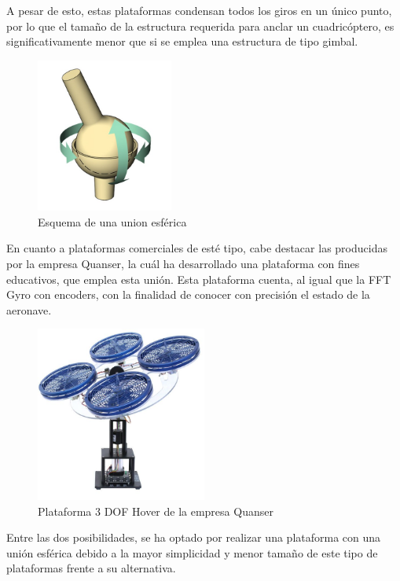 A pesar de esto, estas plataformas condensan todos los giros en un único punto, por lo que el tamaño de la estructura requerida para anclar un cuadricóptero, es significativamente menor  que si se emplea una estructura de tipo gimbal.

\begin{figure}[htb!]
	\centering
	\includegraphics[width=0.4\textwidth]{estadodelarte/union_esferica}
	\caption{Esquema de una union esférica}
	\label{union esferica}
\end{figure}
\newpage
En cuanto a plataformas comerciales de esté tipo, cabe destacar las producidas por la empresa Quanser, la cuál ha desarrollado una plataforma con fines educativos, que emplea esta unión. Esta plataforma cuenta, al igual que la FFT Gyro con encoders, con la finalidad de conocer con precisión el estado de la aeronave.
   
\begin{figure}[htb!]
	\centering
	\includegraphics[width=0.5\textwidth]{estadodelarte/quanser}
	\caption{Plataforma 3 DOF Hover de la empresa Quanser}
	\label{union esferica}
\end{figure}

Entre las dos posibilidades, se ha optado por realizar una plataforma con una unión esférica debido a la mayor simplicidad y menor tamaño de este tipo de plataformas frente a su alternativa.

